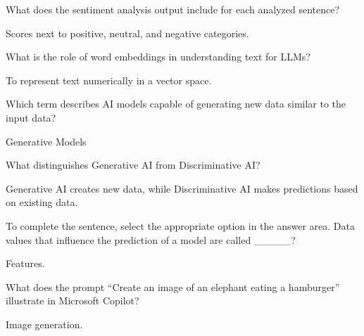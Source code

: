 \begin{qanda}
	\begin{question}
What does the sentiment analysis output include for each analyzed sentence?
	\end{question}
	\begin{answer}
Scores next to positive, neutral, and negative categories.
	\end{answer}
\end{qanda}

\begin{qanda}
	\begin{question}
What is the role of word embeddings in understanding text for LLMs?
	\end{question}
	\begin{answer}
To represent text numerically in a vector space.
	\end{answer}
\end{qanda}

\begin{qanda}
	\begin{question}
Which term describes AI models capable of generating new data similar to the input data?
	\end{question}
	\begin{answer}
Generative Models
	\end{answer}
\end{qanda}

\begin{qanda}
	\begin{question}
What distinguishes Generative AI from Discriminative AI?
	\end{question}
	\begin{answer}
Generative AI creates new data, while Discriminative AI makes predictions based on existing data.
	\end{answer}
\end{qanda}

\begin{qanda}
	\begin{question}
To complete the sentence, select the appropriate option in the answer area. Data values that influence the prediction of a model are called \_\_\_\_\_?
	\end{question}
	\begin{answer}
Features.
	\end{answer}
\end{qanda}

\begin{qanda}
	\begin{question}
What does the prompt “Create an image of an elephant eating a hamburger” illustrate in Microsoft Copilot?
	\end{question}
	\begin{answer}
Image generation.
	\end{answer}
\end{qanda}

